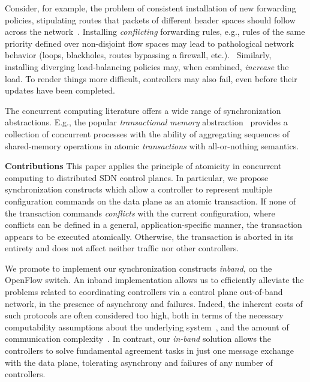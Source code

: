 \documentclass[conference]{sigcomm-alternate}
\begin{document}
Consider, for example, the problem of
consistent installation of new forwarding policies, stipulating routes
that packets of different header spaces should follow across the
network~\cite{network-update,roger-hotnets,podc15}.
Installing \emph{conflicting} forwarding rules, e.g., rules of the same priority defined over non-disjoint
flow spaces may lead to pathological network behavior (loops,
blackholes, routes bypassing a firewall, etc.).~\cite{hotnets14update,roger-hotnets}
Similarly, installing diverging load-balancing policies may,
when combined, \emph{increase} the load.
To render things more difficult, controllers may also fail,
even before their updates have been completed.

The concurrent computing literature offers
a wide range of synchronization abstractions.
E.g., the popular \emph{transactional
  memory} abstraction~\cite{tm-book} provides a collection of
concurrent processes with the ability of aggregating sequences of
shared-memory operations in atomic \emph{transactions} with
all-or-nothing semantics.


\noindent\textbf{Contributions}
This paper applies the principle of atomicity in concurrent computing
to distributed SDN control planes.
%
In particular, we propose synchronization constructs which
allow a controller to represent multiple configuration commands on
the data plane as an atomic transaction.
%
If none of the transaction commands \emph{conflicts}  with the current
configuration, where conflicts can be
defined in a general, application-specific manner, the transaction appears to be executed atomically.
Otherwise, the transaction is aborted in its entirety and does not
affect neither traffic nor other controllers.

We promote to implement our synchronization constructs \emph{inband},
on the OpenFlow switch.
An inband implementation allows us to efficiently alleviate the problems related to
coordinating controllers via a control plane
out-of-band network, in the presence of asynchrony and failures.
Indeed, the inherent costs  of such protocols are often considered too high, both in
terms of the necessary computability assumptions about the underlying
system~\cite{FLP85}, and the amount of communication
complexity~\cite{Lam06}.
In contrast, our \emph{in-band} solution allows the
controllers to solve fundamental agreement tasks in just one message
exchange with the data plane, tolerating asynchrony and failures of
any number of controllers. 
\end{document}
